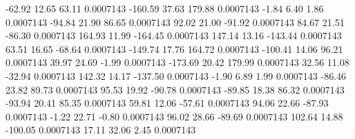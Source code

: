       -62.92       12.65       63.11     0.0007143
     -160.59       37.63      179.88     0.0007143
       -1.84        6.40        1.86     0.0007143
      -94.84       21.90       86.65     0.0007143
       92.02       21.00      -91.92     0.0007143
       84.67       21.51      -86.30     0.0007143
      164.93       11.99     -164.45     0.0007143
      147.14       13.16     -143.44     0.0007143
       63.51       16.65      -68.64     0.0007143
     -149.74       17.76      164.72     0.0007143
     -100.41       14.06       96.21     0.0007143
       39.97       24.69       -1.99     0.0007143
     -173.69       20.42      179.99     0.0007143
       32.56       11.08      -32.94     0.0007143
      142.32       14.17     -137.50     0.0007143
       -1.90        6.89        1.99     0.0007143
      -86.46       23.82       89.73     0.0007143
       95.53       19.92      -90.78     0.0007143
      -89.85       18.38       86.32     0.0007143
      -93.94       20.41       85.35     0.0007143
       59.81       12.06      -57.61     0.0007143
       94.06       22.66      -87.93     0.0007143
       -1.22       22.71       -0.80     0.0007143
       96.02       28.66      -89.69     0.0007143
      102.64       14.88     -100.05     0.0007143
       17.11       32.06        2.45     0.0007143
